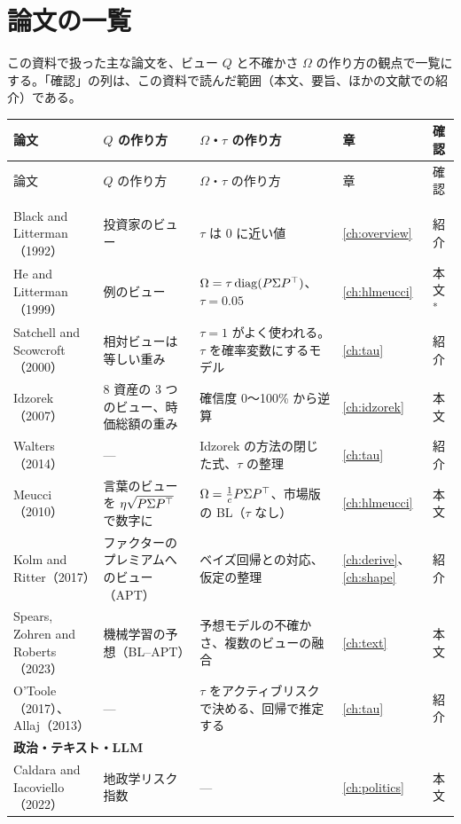 \chapter{論文の一覧}\label{app:papers}

この資料で扱った主な論文を、ビュー $Q$ と不確かさ $\Omega$ の作り方の観点で一覧にする。「確認」の列は、この資料で読んだ範囲（本文、要旨、ほかの文献での紹介）である。

\begin{longtable}{p{2.8cm}p{3.7cm}p{4.0cm}p{0.9cm}p{0.8cm}}
\toprule
論文 & $Q$ の作り方 & $\Omega$・$\tau$ の作り方 & 章 & 確認 \\
\midrule
\endfirsthead
\toprule
論文 & $Q$ の作り方 & $\Omega$・$\tau$ の作り方 & 章 & 確認 \\
\midrule
\endhead
\bottomrule
\endfoot
\multicolumn{5}{l}{\textbf{BL の基礎と $\Omega$・$\tau$}}\\
Black and Litterman（1992） & 投資家のビュー & $\tau$ は 0 に近い値 & \ref{ch:overview} & 紹介 \\
He and Litterman（1999） & 例のビュー & $\Omega=\tau\operatorname{diag}(P\Sigma P^{\top})$、$\tau=0.05$ & \ref{ch:hlmeucci} & 本文\textsuperscript{*} \\
Satchell and Scowcroft（2000） & 相対ビューは等しい重み & $\tau=1$ がよく使われる。$\tau$ を確率変数にするモデル & \ref{ch:tau} & 紹介 \\
Idzorek（2007） & 8 資産の 3 つのビュー、時価総額の重み & 確信度 0〜100\% から逆算 & \ref{ch:idzorek} & 本文 \\
Walters（2014） & --- & Idzorek の方法の閉じた式、$\tau$ の整理 & \ref{ch:tau} & 紹介 \\
Meucci（2010） & 言葉のビューを $\eta\sqrt{P\Sigma P^{\top}}$ で数字に & $\Omega=\frac1cP\Sigma P^{\top}$、市場版の BL（$\tau$ なし） & \ref{ch:hlmeucci} & 本文 \\
Kolm and Ritter（2017） & ファクターのプレミアムへのビュー（APT） & ベイズ回帰との対応、仮定の整理 & \ref{ch:derive}、\ref{ch:shape} & 紹介 \\
Spears, Zohren and Roberts（2023） & 機械学習の予想（BL--APT） & 予想モデルの不確かさ、複数のビューの融合 & \ref{ch:text} & 本文 \\
O'Toole（2017）、Allaj（2013） & --- & $\tau$ をアクティブリスクで決める、回帰で推定する & \ref{ch:tau} & 紹介 \\
\multicolumn{5}{l}{\textbf{政治・テキスト・LLM}}\\
Caldara and Iacoviello（2022） & 地政学リスク指数 & --- & \ref{ch:politics} & 本文 \\

\end{longtable}
